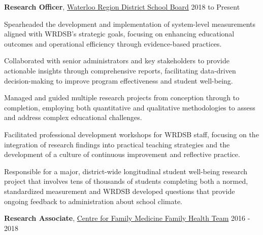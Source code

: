 \documentclass[10pt]{article}
\newenvironment{innerlist}[1][\enskip\textbullet]%
        {\begin{compactenum}[#1]}{\end{compactenum}}
\providecommand{\tightlist}{%
  \setlength{\itemsep}{0pt}\setlength{\parskip}{0pt}}
\begin{document}
\begin{outerlist}
\item
  \textbf{Research Officer},
  \href{https://www.wrdsb.ca/about-the-wrdsb/research/}{Waterloo Region
  District School Board} \hfill  2018 to Present

 \begin{innerlist}
  \tightlist
  \item
    Spearheaded the development and implementation of system-level
    measurements aligned with WRDSB's strategic goals, focusing on
    enhancing educational outcomes and operational efficiency through
    evidence-based practices.
  \item
    Collaborated with senior administrators and key stakeholders to
    provide actionable insights through comprehensive reports,
    facilitating data-driven decision-making to improve program
    effectiveness and student well-being.
  \item
    Managed and guided multiple research projects from conception
    through to completion, employing both quantitative and qualitative
    methodologies to assess and address complex educational challenges.
  \item
    Facilitated professional development workshops for WRDSB staff,
    focusing on the integration of research findings into practical
    teaching strategies and the development of a culture of continuous
    improvement and reflective practice.
  \item
    Responsible for a major, district-wide longitudinal student
    well-being research project that involves tens of thousands of
    students completing both a normed, standardized measurement and
    WRDSB developed questions that provide ongoing feedback to
    administration about school climate.
 \end{innerlist}
\item
  \textbf{Research Associate}, \href{https://family-medicine.ca/}{Centre
  for Family Medicine Family Health Team} \hfill 2016 - 2018


\end{outerlist}
\end{document}
